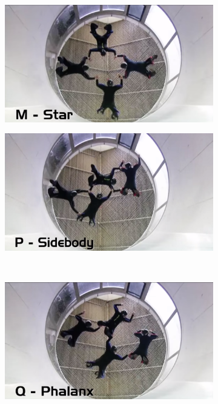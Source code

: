 \documentclass[a4paper, 11pt]{article}
\begin{document}
\begin{figure}[H]
	\centering
	\begin{subfigure}{.5\textwidth}
		\centering
		\includegraphics[width=0.9\linewidth]{Tunnel_Star.png}
	\end{subfigure}%
	\begin{subfigure}{.5\textwidth}
		\centering
		\includegraphics[width=0.9\linewidth]{Tunnel_Sidebody.png}
	\end{subfigure}\\
	\begin{subfigure}{.5\textwidth}
		\centering
		\includegraphics[width=0.9\linewidth]{Tunnel_Phalanx.png}

\end{subfigure}
\end{figure}
\end{document}
